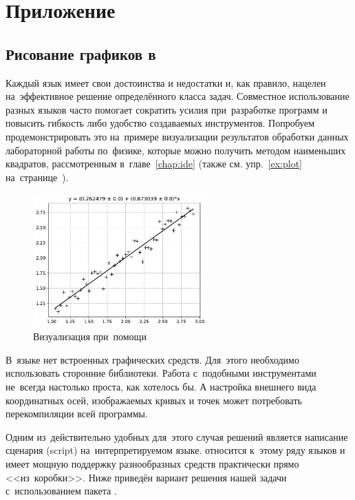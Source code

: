 
\chapter{Приложение}

\section{Рисование графиков в }\label{sect:pyplot}
Каждый язык имеет свои достоинства и недостатки и, как правило, нацелен на~эффективное решение определённого класса задач. Совместное использование разных языков часто помогает сократить усилия при~разработке программ и повысить гибкость либо удобство создаваемых инструментов. Попробуем продемонстрировать это на~примере визуализации результатов обработки данных лабораторной работы по~физике, которые можно получить методом наименьших квадратов, рассмотренным в~главе~\ref{chap:ide} (также см. упр.~\ref{ex:plot} на~странице~\pageref{ex:plot}).

\begin{figure}[ht]
  {\centering
    \includegraphics[width=0.6\textwidth]{images/line_approx.pdf}

  }
  \caption{Визуализация при~помощи }
  \label{fig:pyplot}
\end{figure}

В~языке  нет встроенных графических средств. Для~этого необходимо использовать сторонние библиотеки. Работа с~подобными инструментами не~всегда настолько проста, как хотелось бы. А настройка внешнего вида координатных осей, изображаемых кривых и точек может потребовать перекомпиляции всей программы.

Одним из~действительно удобных для~этого случая решений является написание сценария (\textenglish{script}) на~интерпретируемом языке. \href{\pythonurl}{} относится к~этому ряду языков и имеет мощную поддержку разнообразных средств практически прямо <<из~коробки>>. Ниже приведён вариант решения нашей задачи с~использованием пакета \href{\matplotliburl}{}.


